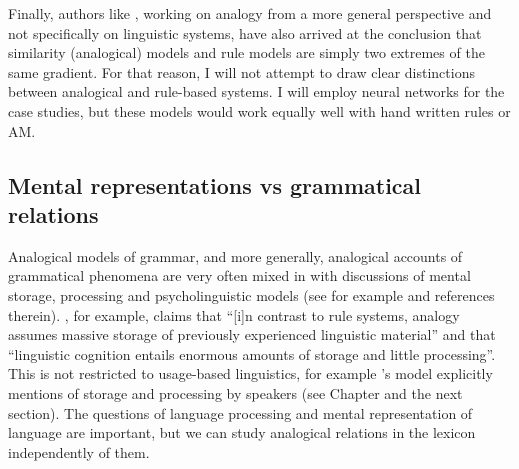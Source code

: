 Finally, authors like \textcite{Pothos.2005}, working on analogy from a more general perspective and not specifically on linguistic systems, have also arrived at the conclusion that similarity (analogical) models and rule models are simply two extremes of the same gradient. For that reason, I will not attempt to draw clear distinctions between analogical and rule-based systems. I will employ neural networks for the case studies, but these models would work equally well with hand written rules or AM.


\subsection{Mental representations vs grammatical relations}

Analogical models of grammar, and more generally, analogical accounts of grammatical phenomena are very often mixed in with discussions of mental storage, processing and psycholinguistic models (see for example \cite{Bybee.2010} and references therein). \textcite[419--420]{Eddington.2009}, for example, claims that ``[i]n contrast to rule systems, analogy assumes massive storage of previously experienced linguistic material'' and that ``linguistic cognition entails enormous amounts of storage and little processing''. This is not restricted to usage-based linguistics, for example \citet{Gouskova.2015}'s model explicitly mentions of storage and processing by speakers (see Chapter  and the next section). The questions of language processing and mental representation of language are important, but we can study analogical relations in the lexicon independently of them.


